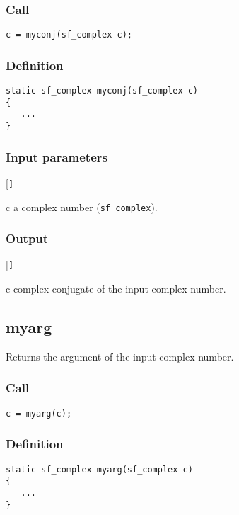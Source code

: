 \subsubsection*{Call}
\begin{verbatim}c = myconj(sf_complex c);\end{verbatim}

\subsubsection*{Definition}
\begin{verbatim}
static sf_complex myconj(sf_complex c)
{
   ...
}
\end{verbatim}

\subsubsection*{Input parameters}
\begin{desclist}{\tt }{\quad}[\tt ]
   \setlength\itemsep{0pt}
   \item[c] a complex number (\texttt{sf\_complex}).  
\end{desclist}

\subsubsection*{Output}
\begin{desclist}{\tt }{\quad}[\tt ]
   \setlength\itemsep{0pt}
   \item[c] complex conjugate of the input complex number.
\end{desclist}




\subsection{{myarg}}
Returns the argument of the input complex number.

\subsubsection*{Call}
\begin{verbatim}c = myarg(c);\end{verbatim}

\subsubsection*{Definition}
\begin{verbatim}
static sf_complex myarg(sf_complex c)
{
   ...
}
\end{verbatim}

